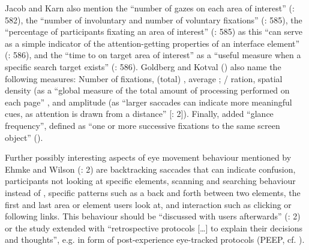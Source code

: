 Jacob and Karn also mention the “number of gazes on each area of interest” (\citeyear{Jacob2003}: 582), the “number of involuntary and number of voluntary fixations” (\citealt{Ehmke2007}: 585), the “percentage of participants fixating an area of interest” (\citeyear{Ehmke2007}: 585) as this “can serve as a simple indicator of the attention-getting properties of an interface element” (\citeyear{Ehmke2007}: 586), and the “time to  on target area of interest” as a “useful measure when a specific search target exists” (\citeyear{Ehmke2007}: 586). Goldberg and Kotval (\citeyear{Goldberg1999}) also name the following measures: Number of fixations, (total) , average ; / ration,  spatial density (as a “global measure of the total amount of processing performed on each page” \citep{Cowen2002}, and  amplitude (as “larger saccades can indicate more meaningful cues, as attention is drawn from a distance” [\citealt{Ehmke2007}: 2]). Finally, \citet{mccarthy2003} added “glance frequency”, defined as “one or more successive fixations to the same screen object” (\citeyear{mccarthy2003}).

Further possibly interesting aspects of eye movement behaviour mentioned by Ehmke and Wilson (\citeyear{Ehmke2007}: 2) are backtracking saccades that can indicate confusion, participants not looking at specific elements, scanning and searching behaviour instead of , specific patterns such as a back and forth between two elements, the first and last area or element users look at, and interaction such as clicking or following links. This behaviour should be “discussed with users afterwards” (\citealt{Ehmke2007}: 2) or the study extended with “retrospective protocols […] to explain their decisions and thoughts”, e.g. in form of post-experience eye-tracked protocols (PEEP, cf. \citealt{Ball2006}).

